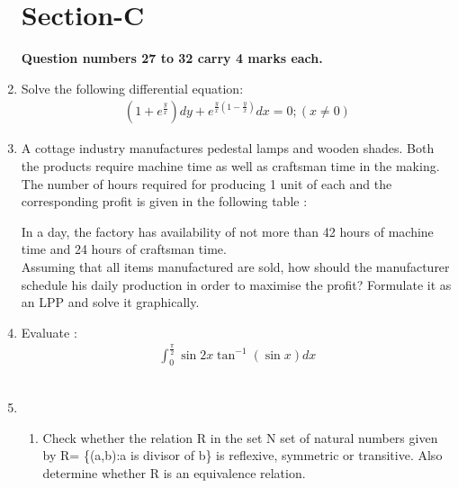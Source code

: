 \documentclass[journal,12pt,twocolumn]{IEEEtran}
\renewcommand\thesection{\arabic{section}}
\begin{document}
\begin{enumerate}[label=\thesection.\arabic*.,ref=\thesection.\theenumi]
\section{Section-C}
\textbf{Question numbers 27 to 32 carry 4 marks each.}\\

\item Solve the following differential equation: \begin{align} (1+e^{\frac{y}{x}}) dy+e^{\frac{y}{x}(1-\frac{y}{x})} dx = 0 ; (x\not= 0) \nonumber \end{align}

\item A cottage industry manufactures pedestal lamps and wooden shades. Both the products require machine time as well as craftsman time in the making. The number of hours required for producing 1 unit of each and the corresponding profit is given in the following table :
\begin{table}[htb]
\tiny
\caption{}
\end{table}
In a day, the factory has availability of not more than 42 hours of machine time and 24 hours of craftsman time.\\
Assuming that all items manufactured are sold, how should the manufacturer schedule his daily production in order to maximise the profit? Formulate it as an LPP and solve it graphically.\\

 \item Evaluate : \begin{align} \int_{0}^{\frac{\pi}{2}} \sin2x \tan^{-1}  \left(\sin x\right)dx \nonumber \end{align}\\

 \item \begin{enumerate} \item Check whether the relation R in the set N set of natural numbers given by R= \{(a,b):a is divisor of b\} is reflexive, symmetric or transitive. Also determine whether R is an equivalence relation. 
    

\end{enumerate}
\end{enumerate}
\end{document}
